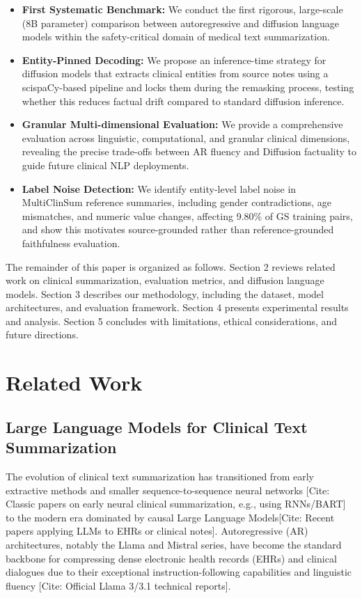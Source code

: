 \documentclass[11pt]{article}
\begin{document}
\begin{itemize}
    \item \textbf{First Systematic Benchmark:} We conduct the first rigorous, large-scale (8B parameter) comparison between autoregressive and diffusion language models within the safety-critical domain of medical text summarization.
    \item \textbf{Entity-Pinned Decoding:} We propose an inference-time strategy for diffusion models that extracts clinical entities from source notes using a scispaCy-based pipeline and locks them during the remasking process, testing whether this reduces factual drift compared to standard diffusion inference.
    \item \textbf{Granular Multi-dimensional Evaluation:} We provide a comprehensive evaluation across linguistic, computational, and granular clinical dimensions, revealing the precise trade-offs between AR fluency and Diffusion factuality to guide future clinical NLP deployments.
    \item \textbf{Label Noise Detection:} We identify entity-level label noise in MultiClinSum reference summaries, including gender contradictions, age mismatches, and numeric value
    changes, affecting 9.80\% of GS training pairs, and show this motivates source-grounded rather than reference-grounded faithfulness evaluation.
\end{itemize}

The remainder of this paper is organized as follows. Section 2 reviews related work on clinical summarization, evaluation metrics, and diffusion language models. Section 3 describes our methodology, including the dataset, model architectures, and evaluation framework. Section 4 presents experimental results and analysis. Section 5 concludes with limitations, ethical considerations, and future directions. 

\section{Related Work}

\subsection{Large Language Models for Clinical Text Summarization}
The evolution of clinical text summarization has transitioned from early extractive methods and smaller sequence-to-sequence neural networks [Cite: Classic papers on early neural clinical summarization, e.g., using RNNs/BART] to the modern era dominated by causal Large Language Models[Cite: Recent papers applying LLMs to EHRs or clinical notes]. Autoregressive (AR) architectures, notably the Llama and Mistral series, have become the standard backbone for compressing dense electronic health records (EHRs) and clinical dialogues due to their exceptional instruction-following capabilities and linguistic fluency [Cite: Official Llama 3/3.1 technical reports].
\end{document}
